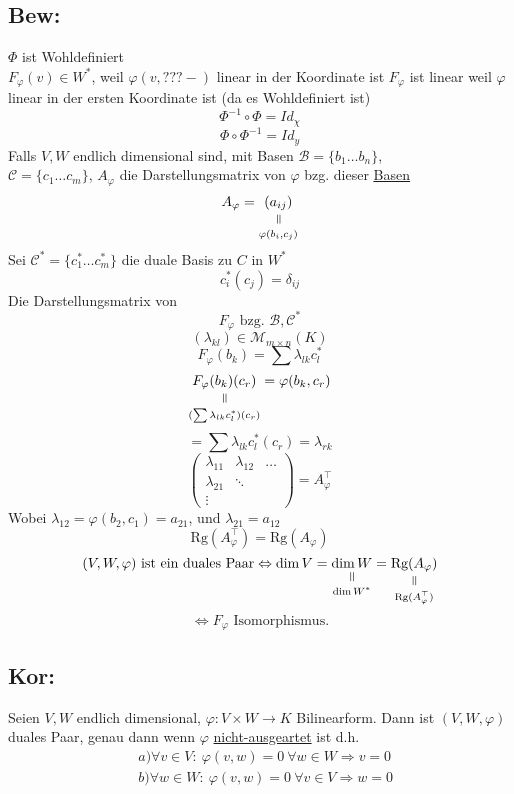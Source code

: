 \documentclass[titlepage,12pt,a4paper,ngerman]{report}
\newcommand{\verteq}{\rotatebox{90}{$\,=$}}
\newcommand{\equalto}[2]{\underset{\scriptstyle\overset{\mkern4mu\verteq}{#2}}{#1}}
\newcommand{\tx}[1]{\textrm{#1}}
\begin{document}
\subsection{Bew:}
$ \Phi $ ist Wohldefiniert\\
$ F_\varphi (v) \in W^* $, weil $ \varphi(v,???-) $ linear in der Koordinate ist $ F_\varphi $ ist linear weil $ \varphi $ linear in der ersten Koordinate ist (da es Wohldefiniert ist)
$$\Phi^{-1} \circ \Phi = Id_\chi$$
$$\Phi \circ \Phi^{-1} = Id_y$$
Falls $V,W$ endlich dimensional sind, mit Basen $\mathcal{B} = \{b_1 \dots b_n\}$,\\ $\mathcal{C} = \{c_1 \dots c_m\}$, $A_\varphi$ die Darstellungsmatrix von $\varphi$ bzg. dieser \underline{\underline{Basen}}
$$A_\varphi = \equalto{(a_{ij})}{\varphi(b_i, c_j)}$$
Sei $\mathcal C^* = \{c_1^* \dots c_m^*\}$ die duale Basis zu $C$ in $W^*$ 
$$c_i^*(c_j) = \delta_{ij}$$
Die Darstellungsmatrix von
$$F_\varphi \tx{ bzg. } \mathcal B, \mathcal C^*$$
$$(\lambda_{kl}) \in \mathcal M_{m \times n}(K)$$
$$F_\varphi (b_k) = \sum \lambda_{lk} c^*_l$$
$$\equalto{F_\varphi (b_k) (c_r)}{(\sum \lambda_{lk}c_l^*)(c_r)} = \varphi (b_k, c_r)$$
$$= \sum \lambda_{lk}c_l^*(c_r) = \lambda_{rk}$$
$$\begin{pmatrix}
\lambda_{11} & \lambda_{12} & \dots \\
\lambda_{21} & \ddots & \\
\vdots & & 
\end{pmatrix} = A_\varphi^\top$$
Wobei $\lambda_{12} = \varphi(b_2, c_1) = a_{21}$, und $\lambda_{21} = a_{12}$
$$\tx{Rg}(A_\varphi^\top) = \tx{Rg}(A_\varphi)$$
$$(V,W,\varphi) \tx{ ist ein duales Paar} \Leftrightarrow \dim V = \equalto{\dim W}{\dim W^*} = \equalto{\tx{Rg}(A_\varphi)}{\tx{Rg}(A_\varphi^\top)}$$ 
$$\Leftrightarrow F_\varphi \tx{ Isomorphismus.}$$
\subsection{Kor:}
Seien $V,W$ endlich dimensional, $\varphi:V \times W \to K$ Bilinearform. Dann ist $(V,W,\varphi)$ duales Paar, genau dann wenn $\varphi$ \underline{nicht-ausgeartet} ist d.h.
\begin{align*}
&a) \forall v \in V:\ \varphi(v,w) = 0\ \forall w \in W \Rightarrow v = 0 \\
&b) \forall w \in W:\ \varphi(v,w) = 0\ \forall v \in V \Rightarrow w = 0
\end{align*}
\end{document}
